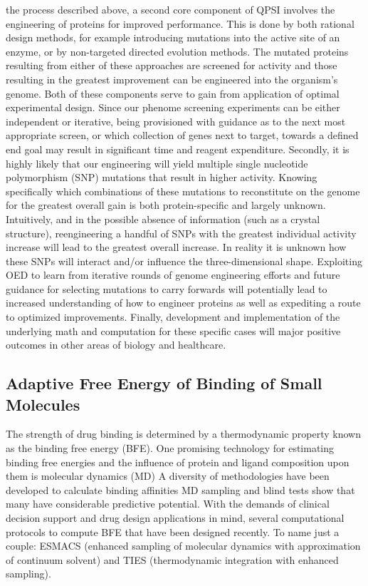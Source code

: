 \documentclass[11pt]{article}
\begin{document}
the process described above, a second core component of QPSI involves
the engineering of proteins for improved performance. This is done by
both rational design methods, for example introducing mutations into
the active site of an enzyme, or by non-targeted directed evolution
methods. The mutated proteins resulting from either of these
approaches are screened for activity and those resulting in the
greatest improvement can be engineered into the organism’s genome.
Both of these components serve to gain from application of optimal
experimental design. Since our phenome screening experiments can be
either independent or iterative, being provisioned with guidance as to
the next most appropriate screen, or which collection of genes next to
target, towards a defined end goal may result in significant time and
reagent expenditure. Secondly, it is highly likely that our
engineering will yield multiple single nucleotide polymorphism (SNP)
mutations that result in higher activity. Knowing specifically which
combinations of these mutations to reconstitute on the genome for the
greatest overall gain is both protein-specific and largely
unknown. Intuitively, and in the possible absence of information (such
as a crystal structure), reengineering a handful of SNPs with the
greatest individual activity increase will lead to the greatest
overall increase. In reality it is unknown how these SNPs will
interact and/or influence the three-dimensional shape. Exploiting OED
to learn from iterative rounds of genome engineering efforts and
future guidance for selecting mutations to carry forwards will
potentially lead to increased understanding of how to engineer
proteins as well as expediting a route to optimized
improvements. Finally, development and implementation of the
underlying math and computation for these specific cases will major
positive outcomes in other areas of biology and healthcare.

\subsection{Adaptive Free Energy of Binding of Small Molecules}

The strength of drug binding is determined by a thermodynamic property
known as the binding free energy (BFE). One promising technology for
estimating binding free energies and the influence of protein and
ligand composition upon them is molecular dynamics (MD) A diversity of
methodologies have been developed to calculate binding affinities MD
sampling and blind tests show that many have considerable predictive
potential. With the demands of clinical decision support and drug
design applications in mind, several computational protocols to
compute BFE that have been designed recently. To name just a couple:
ESMACS (enhanced sampling of molecular dynamics with approximation of
continuum solvent) and TIES (thermodynamic integration with enhanced
sampling).
\end{document}
